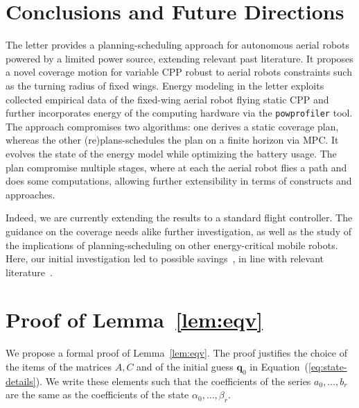 \documentclass[letterpaper,10pt,journal,twoside]{IEEEtran}
\newcommand{\stt}[1]{{\small\tt #1}} %
\newcommand{\powprof}{\stt{powprofiler}}
\theoremstyle{definition}
\begin{document}
\section{Conclusions and Future Directions}  %
\label{sec:conclusion}                       %
The letter provides a planning-scheduling approach for autonomous aerial robots powered by a limited power source, extending relevant past literature. It proposes a novel coverage motion for variable CPP robust to aerial robots constraints such as the turning radius of fixed wings. Energy modeling in the letter exploits collected empirical data of the fixed-wing aerial robot flying static CPP and further incorporates energy of the computing hardware via the \powprof{} tool. The approach compromises two algorithms: one derives a static coverage plan, whereas the other (re)plans-schedules the plan on a finite horizon via MPC. It evolves the state of the energy model while optimizing the battery usage. The plan compromise multiple stages, where at each the aerial robot flies a path and does some computations, allowing further extensibility in terms of constructs and approaches.

Indeed, we are currently extending the results to a standard flight controller. The guidance on the coverage needs alike further investigation, as well as the study of the implications of planning-scheduling on other energy-critical mobile robots. Here, our initial investigation led to possible savings~\cite{seewald2020beyond}, in line with relevant literature~\cite{ondruska2015scheduled,lahijanian2018resource}.


{\small  %
}             %

\appendices

\section{Proof of Lemma~\ref{lem:eqv}}
\label{app:proof-eqv}

We propose a formal proof of Lemma~\ref{lem:eqv}. The proof justifies the choice of the items of the matrices $A,C$ and of the initial guess $\mathbf{q}_0$ in Equation~(\ref{eq:state-details}). We write these elements such that the coefficients of the series $a_0,\dots,b_r$ are the same as the coefficients of the state $\alpha_0,\dots,\beta_r$.
\end{document}
